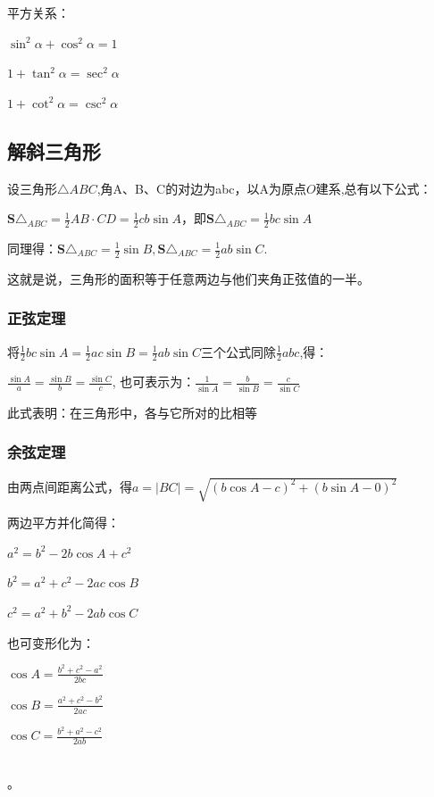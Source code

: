 \documentclass[UTF8]{ctexbook}
\begin{document}
{{{  平方关系：

  $\sin^2\alpha + \cos^2\alpha = 1$

  $1 + \tan^2\alpha = \sec^2\alpha$

  $1 + \cot^2\alpha = \csc^2\alpha$

}

\subsection{解斜三角形}{
设三角形$\triangle ABC$,角A、B、C的对边为abc，以A为原点$O$建系,总有以下公式：

$\mathbf{S}\triangle_{ABC} = \frac{1}{2}AB \cdot CD = \frac{1}{2}cb\sin A$，即$\mathbf{S}\triangle_{ABC} = \frac{1}{2}bc\sin A$

同理得：$\mathbf{S}\triangle_{ABC} = \frac{1}{2}\sin B, \mathbf{S}\triangle_{ABC} = \frac{1}{2}ab\sin C$.

这就是说，三角形的面积等于任意两边与他们夹角正弦值的一半。

\subsubsection{正弦定理}
将$\frac{1}{2}bc\sin A = \frac{1}{2}ac\sin B = \frac{1}{2}ab\sin C$三个公式同除$\frac{1}{2}abc$,得：

$\frac{\sin A}{a} = \frac{\sin B}{b} = \frac{\sin C}{c}$, 也可表示为：$\frac{1}{\sin A} = \frac{b}{\sin B} = \frac{c}{\sin C}$

此式表明：在三角形中，各{}与它所对{}的比相等
}

\subsubsection{余弦定理}{
  由两点间距离公式，得$a = |BC| = \sqrt{(b\cos A - c)^2 + (b\sin A - 0)^2}$

  两边平方并化简得：

  $a^2 = b^2 - 2b\cos A + c^2$

  $b^2 = a^2 + c^2 - 2ac\cos B$

  $c^2 = a^2 + b^2 - 2ab\cos C$

  也可变形化为：

  $\cos A = \frac{b^2 + c^2 - a^2}{2bc}$

  $\cos B = \frac{a^2 + c^2 - b^2}{2ac}$

  $\cos C = \frac{b^2 + a^2 - c^2}{2ab}$
}
\\

。

}}
\end{document}
